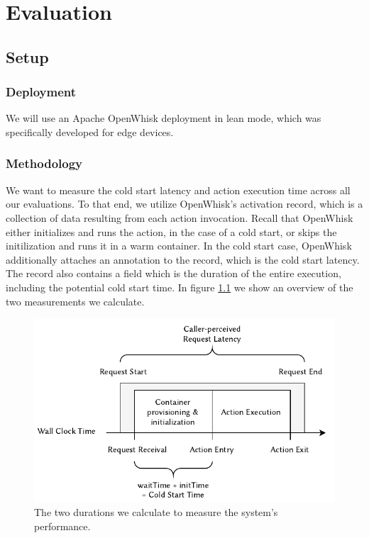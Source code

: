 \chapter{Evaluation}
\label{chapter:evaluation}

\section{Setup}

\subsection{Deployment}

We will use an Apache OpenWhisk deployment in lean mode, which was specifically developed for edge devices.

\subsection{Methodology}

We want to measure the cold start latency and action execution time across all our evaluations. To that end, we utilize OpenWhisk's activation record, which is a collection of data resulting from each action invocation.  Recall that OpenWhisk either initializes and runs the action, in the case of a cold start, or skips the initilization and runs it in a warm container. In the cold start case, OpenWhisk additionally attaches an  annotation to the record, which is the cold start latency. The record also contains a  field which is the duration of the entire execution, including the potential cold start time. In figure \ref{fig:evaluation-time-measurement} we show an overview of the two measurements we calculate.

\begin{figure}
    \begin{center}
        \includegraphics{figures/EvaluationTimeMeasurement.pdf}
    \end{center}
    \caption{The two durations we calculate to measure the system's performance.}
    \label{fig:evaluation-time-measurement}
\end{figure}

